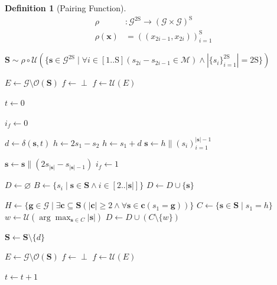 \documentclass{amsart}
\theoremstyle{definition}
\newtheorem{definition}{Definition}
\theoremstyle{remark}
\newcommand{\concat}{\mathbin{\|}}
\begin{document}
\begin{definition}[Pairing Function]
\begin{align*}
	\rho
	&:
	\mathcal{G}^{2\mathrm{S}}
	\to
	(\mathcal{G}\times\mathcal{G})^{\mathrm{S}}
	\\
	\rho(\bm{x})
	&=
	(
		(x_{2i-1},x_{2i})
	)_{i=1}^{\mathrm{S}}
\end{align*}
\end{definition}

\begin{algorithm}[H]
\caption{$\textsc{Game}$}
\begin{algorithmic}
	\State ${
		\bm{S}
		\sim
		\rho\circ\mathcal{U}(
			\{
				\bm{s}\in\mathcal{G}^{2\mathrm{S}}
				\mid
				\forall i\in[1..\mathrm{S}](
					s_{2i}-s_{2i-1}\in\mathcal{M}
				)
				\land
				|\{s_{i}\}_{i=1}^{2\mathrm{S}}|
				=
				2\mathrm{S}
			\}
		)
	}$

	\State $E\gets\mathcal{G}\setminus\mathcal{O}(\bm{S})$
		\State $f\gets\perp$
	\Else{}
		\State $f\gets\mathcal{U}(E)$
	\EndIf

	\State $t\gets 0$

		\State $i_{f}\gets 0$

			\State $d\gets\delta(\bm{s},t)$
				\State $h\gets 2s_{1}-s_{2}$
			\Else{}
				\State $h\gets s_{1}+d$
			\EndIf
			\State $\bm{s}\gets h\concat(s_{i})_{i=1}^{|\bm{s}|-1}$
		\EndFor

				\State ${
					\bm{s}
					\gets
					\bm{s}
					\concat
					(2s_{|\bm{s}|}-s_{|\bm{s}|-1})
				}$
				\State $i_{f}\gets 1$
			\EndIf
		\EndFor

		\State $D\gets\varnothing$
		\State ${
			B
			\gets
			\{
				s_{i}
				\mid
				\bm{s}\bm{\in}\bm{S}
				\land
				i\in[2..|\bm{s}|]
			\}
		}$
				\State $D\gets D\cup\{\bm{s}\}$
			\EndIf
		\EndFor

		\State ${
			H
			\gets
			\{
				\bm{g}\in\mathcal{G}
				\mid
				\exists\bm{c}\bm{\subseteq}\bm{S}(
					|\bm{c}|\geq 2
					\land
					\forall\bm{s}\bm{\in}\bm{c}(s_{1}=\bm{g})
				)
			\}
		}$
			\State $C\gets\{\bm{s}\bm{\in}\bm{S}\mid s_{1}=h\}$
			\State ${
				w
				\gets
				\mathcal{U}(
					\arg\max_{\bm{s}\in C}
					|\bm{s}|
				)
			}$
			\State $D\gets D\cup (C\setminus\{w\})$
		\EndFor

			\State $\bm{S}\gets\bm{S}\bm{\setminus}\{d\}$
		\EndFor

			\State $E\gets\mathcal{G}\setminus\mathcal{O}(\bm{S})$
				\State $f\gets\perp$
			\Else{}
				\State $f\gets\mathcal{U}(E)$
			\EndIf
		\EndIf

		\State $t\gets t+1$
	\EndWhile
\end{algorithmic}
\end{algorithm}
\end{document}
